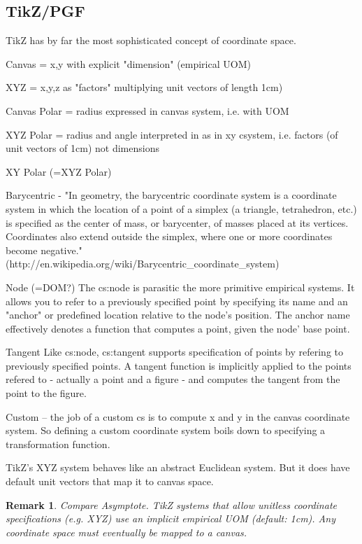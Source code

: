 \documentclass[reqno,12pt]{tufte-handout}
\numberwithin{equation}{subsection}
\numberwithin{equation}{subsection}
\newtheorem{remark}{Remark}
\newcommand\cspace{coordinate space}
\begin{document}
\begin{appendices}
    \subsection{TikZ/PGF}
    \label{subsec:tikz}

    TikZ has by far the most sophisticated concept of coordinate space.

    Canvas =  x,y with explicit "dimension" (empirical UOM)

    XYZ    =  x,y,z as "factors" multiplying unit vectors of length 1cm)

    Canvas Polar = radius expressed in canvas system, i.e. with UOM

    XYZ Polar  = radius and angle interpreted in as in xy csystem, i.e. factors (of unit vectors of 1cm) not dimensions

    XY Polar (=XYZ Polar)

    Barycentric  -  "In geometry, the barycentric coordinate system is a coordinate system in which the location of a point of a simplex (a triangle, tetrahedron, etc.) is specified as the center of mass, or barycenter, of masses placed at its vertices. Coordinates also extend outside the simplex, where one or more coordinates become negative."   (http://en.wikipedia.org/wiki/Barycentric\_coordinate\_system)

    Node (=DOM?)  The cs:node is parasitic the more primitive empirical
    systems.  It allows you to refer to a previously specified point by
    specifying its name and an "anchor" or predefined location relative to
    the node's position.  The anchor name effectively denotes a function
    that computes a point, given the node' base point.

    Tangent Like cs:node, cs:tangent supports specification of points by
    refering to previously specified points.  A tangent function is
    implicitly applied to the points refered to - actually a point and a
    figure - and computes the tangent from the point to the figure.

    Custom -- the job of a custom cs is to compute x and y in the canvas
    coordinate system.  So defining a custom coordinate system boils down
    to specifying a transformation function.

    TikZ's XYZ system behaves like an abstract Euclidean system.  But it
    does have default unit vectors that map it to canvas space.

    \begin{remark}
      Compare Asymptote.  TikZ systems that allow unitless coordinate
      specifications (e.g. XYZ) use an implicit empirical UOM (default:
      1cm).  Any \cspace{} must eventually be mapped to a canvas.
    \end{remark}


\end{appendices}
\end{document}

